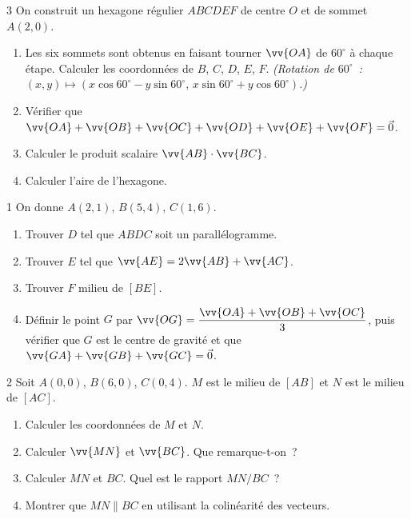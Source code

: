 \begin{probleme}{3}
On construit un hexagone r\'egulier $ABCDEF$ de centre $O$ et de sommet
$A(2,0)$.
\begin{enumerate}
  \item Les six sommets sont obtenus en faisant tourner $\vv{OA}$
        de $60^{\circ}$ \`a chaque \'etape. Calculer les coordonn\'ees de
        $B$, $C$, $D$, $E$, $F$.
        \emph{(Rotation de $60^{\circ}$~: $(x,y)\mapsto(x\cos60^{\circ}-y\sin60^{\circ},\,x\sin60^{\circ}+y\cos60^{\circ})$.)}
  \item V\'erifier que $\vv{OA}+\vv{OB}+\vv{OC}+\vv{OD}+\vv{OE}+\vv{OF}=\vec{0}$.
  \item Calculer le produit scalaire $\vv{AB}\cdot\vv{BC}$.
  \item Calculer l'aire de l'hexagone.
\end{enumerate}
\end{probleme}

\begin{probleme}{1}
On donne $A(2,1)$, $B(5,4)$, $C(1,6)$.
\begin{enumerate}
  \item Trouver $D$ tel que $ABDC$ soit un parall\'elogramme.
  \item Trouver $E$ tel que $\vv{AE} = 2\vv{AB} + \vv{AC}$.
  \item Trouver $F$ milieu de $[BE]$.
  \item Définir le point $G$ par
        $\vv{OG}=\dfrac{\vv{OA}+\vv{OB}+\vv{OC}}{3}$, puis vérifier que $G$
        est le centre de gravité et
        que $\vv{GA}+\vv{GB}+\vv{GC}=\vec{0}$.
\end{enumerate}
\end{probleme}

\begin{probleme}{2}
Soit $A(0,0)$, $B(6,0)$, $C(0,4)$. $M$ est le milieu de $[AB]$
et $N$ est le milieu de $[AC]$.
\begin{enumerate}
  \item Calculer les coordonn\'ees de $M$ et $N$.
  \item Calculer $\vv{MN}$ et $\vv{BC}$.
        Que remarque-t-on~?
  \item Calculer $MN$ et $BC$.
        Quel est le rapport $MN/BC$~?
  \item Montrer que $MN\parallel BC$ en utilisant la colin\'earit\'e des vecteurs.
\end{enumerate}
\end{probleme}

